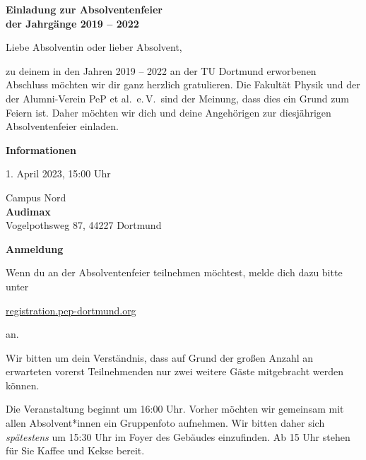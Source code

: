 \documentclass[parskip=half, fontsize=10pt, paper=a5]{scrartcl}
\begin{document}
\raggedright


\begin{center}
\textbf{\Large Einladung zur Absolventenfeier\\ der Jahrgänge 2019 – 2022}
\end{center}
\vspace{0.5cm}

Liebe Absolventin oder lieber Absolvent,

zu deinem in den Jahren 2019 – 2022 an der TU Dortmund erworbenen Abschluss möchten
wir dir ganz herzlich gratulieren.
Die Fakultät Physik und der der Alumni-Verein PeP et al.\ e.\,V.\ sind der Meinung, dass dies ein Grund zum Feiern ist.
Daher möchten wir dich und deine Angehörigen zur diesjährigen Absolventenfeier einladen.

\vspace{0.25cm}
\textcolor{tu}{\textbf{\large Informationen}}
\begin{description}[style=multiline, leftmargin=5em]
  \item[Wann] 1. April 2023, 15:00 Uhr
  \item[Wo] Campus Nord\\
    \textbf{Audimax}\\
    Vogelpothsweg 87, 44227 Dortmund
\end{description}

\vspace{0.25cm}
\textcolor{tu}{\textbf{\large Anmeldung}}

Wenn du an der Absolventenfeier teilnehmen möchtest, melde dich dazu bitte unter
\begin{center}
  \large
  \href{https://registration.pep-dortmund.org/events/absol23/registration}{registration.pep-dortmund.org} 
\end{center}
an.

Wir bitten um dein Verständnis, dass auf Grund der großen Anzahl an erwarteten vorerst Teilnehmenden nur zwei weitere
Gäste mitgebracht werden können.

Die Veranstaltung beginnt um 16:00 Uhr. Vorher möchten wir gemeinsam mit allen Absolvent*innen ein Gruppenfoto aufnehmen.
Wir bitten daher sich \emph{spätestens} um 15:30 Uhr im Foyer des Gebäudes einzufinden.
Ab 15 Uhr stehen für Sie Kaffee und Kekse bereit.
\end{document}
